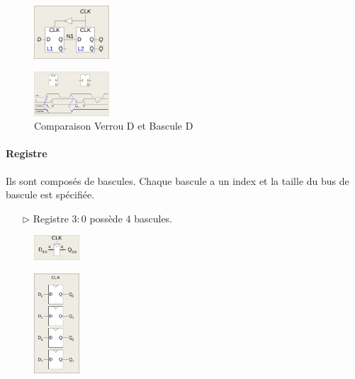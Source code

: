 \documentclass{report}
\begin{document}
\begin{multicols*}{3}
   \begin{figure}[H]
    \begin{center}
      \includegraphics[width=0.25\textwidth]{BasculeD.png}
    \end{center}
   \end{figure}

   \begin{figure}[H]
    \begin{center}
      \includegraphics[width=0.25\textwidth]{VerrouBasculeComparaison.png}
    \end{center}
    \caption{Comparaison Verrou D et Bascule D}
   \end{figure}

   \paragraph{Registre}
    Ils sont composés de bascules. Chaque bascule a un index et la taille 
    du bus de bascule est spécifiée. 
    \begin{itemize}
      \item [$\rhd$ ] Registre $3:0$ possède $4$ bascules.
    \end{itemize} 

    \begin{figure}[H]
      \begin{center}
        \includegraphics[width=0.15\textwidth]{RegistreExemple.png}
      \end{center}
    \end{figure}


    \begin{figure}[H]
      \begin{center}
        \includegraphics[width=0.15\textwidth]{4Bascules}
      \end{center}
    \end{figure}



\end{multicols*}
\end{document}
